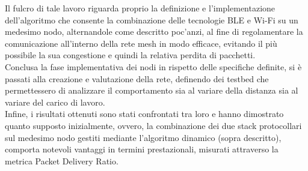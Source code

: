 Il fulcro di tale lavoro riguarda proprio la definizione e l'implementazione dell'algoritmo che consente la combinazione delle tecnologie BLE e Wi-Fi su un medesimo nodo, alternandole come descritto poc'anzi, al fine di regolamentare la comunicazione all'interno della rete mesh in modo efficace, evitando il più possibile la sua congestione e quindi la relativa perdita di pacchetti. \\ 
Conclusa la fase implementativa dei nodi in rispetto delle specifiche definite, si è passati alla creazione e valutazione della rete, definendo dei testbed che permettessero di analizzare il comportamento sia al variare della distanza sia al variare del carico di lavoro. \\
Infine, i risultati ottenuti sono stati confrontati tra loro e hanno dimostrato quanto supposto inizialmente, ovvero, la combinazione dei due stack protocollari sul medesimo nodo gestiti mediante l'algoritmo dinamico (sopra descritto), comporta notevoli vantaggi in termini prestazionali, misurati attraverso la metrica Packet Delivery Ratio.\\

